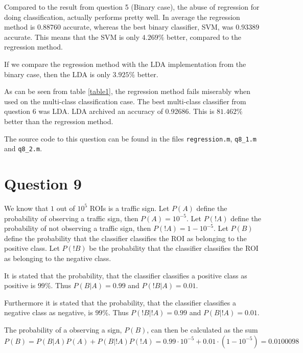\documentclass[10pt]{article}
\begin{document}
Compared to the result from question 5 (Binary case), the abuse of regression for doing classification, actually performs pretty well. In average the regression method is $0.88760$ accurate, whereas the best binary classifier, SVM, was $0.93389$ accurate. This means that the SVM is only $4.269\%$ better, compared to the regression method.

If we compare the regression method with the LDA implementation from the binary case, then the LDA is only $3.925\%$ better.

As can be seen from table \ref{table1}, the regression method fails miserably when used on the multi-class classification case. The best multi-class classifier from question 6 was LDA. LDA archived an accuracy of 0.92686. This is $81.462\%$ better than the regression method.
                                                                                                                    
The source code to this question can be found in the files \texttt{regression.m}, \texttt{q8\_1.m} and \texttt{q8\_2.m}. 


\section*{Question 9} %
\label{sec:question_9}

We know that $1$ out of $10^5$ ROIs is a traffic sign. Let $P(A)$ define the probability of observing a traffic sign, then $P(A) = 10^{-5}$. Let $P(!A)$ define the probability of not observing a traffic sign, then $P(!A) = 1-10^{-5}$. Let $P(B)$ define the probability that the classifier classifies the ROI as belonging to the positive class. Let $P(!B)$ be the probability that the classifier classifies the ROI as belonging to the negative class. 

It is stated that the probability, that the classifier classifies a positive class as positive is $99\%$\cite{assignment}. Thus $P(B|A)=0.99$ and $P(!B|A)=0.01$. 

Furthermore it is stated that the probability, that the classifier classifies a negative class as negative, is $99\%$\cite{assignment}. Thus $P(!B|!A) = 0.99$ and $P(B|!A) = 0.01$.

The probability of a observing a sign, $P(B)$, can then be calculated as the sum  
\begin{equation}
  P(B) = P(B|A)P(A)+P(B|!A)P(!A) = 0.99 \cdot 10^{-5} + 0.01 \cdot (1-10^{-5}) = 0.0100098
\end{equation} 
\end{document}
